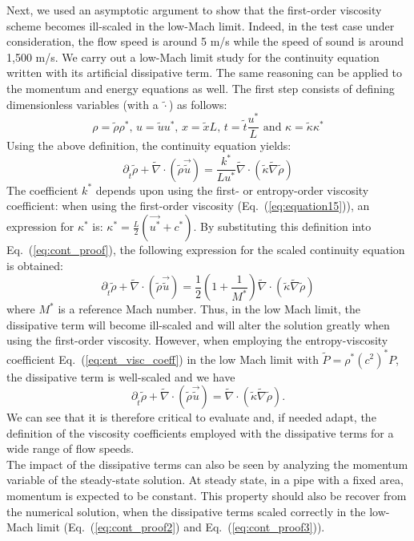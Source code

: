 \documentclass[12pt]{article}
\newcommand{\eqt}[1]{Eq.~(\ref{#1})} %
\begin{document}
Next, we used an asymptotic argument to show that the first-order viscosity scheme becomes ill-scaled in the low-Mach limit. Indeed, in the test case under consideration, the flow speed  is around 5 m/s while the speed of sound is around 1,500 m/s. We carry out a low-Mach limit study for the continuity equation written with its artificial dissipative term. The same reasoning can be applied to the momentum and energy equations as well. The first step consists of defining dimensionless variables (with a $\tilde{\cdot}$) as follows:
\begin{equation}
\rho = \tilde{\rho} \rho^* \text{, } u = \tilde{u} u^* \text{, } x = \tilde{x} L \text{, } t = \tilde{t} \frac{u^*}{L} \text{ and } \kappa = \tilde{\kappa} \kappa^* 
\end{equation}
Using the above definition, the continuity equation yields:
\begin{equation}
\label{eq:cont_proof}
\partial_{\tilde{t}} \tilde{\rho} + \tilde{\nabla} \cdot \left( \tilde{\rho} \vec{\tilde{u}} \right) =  \frac{k^*}{L u^*}  \tilde{\nabla}  \cdot  \left( \tilde{\kappa}  \tilde{\nabla} \tilde{\rho} \right)
\end{equation}
The coefficient $k^*$ depends upon using the first- or entropy-order viscosity coefficient: when using the first-order viscosity (\eqt{eq:equation15}), an expression for $\kappa^*$ is: $\kappa^* = \frac{L}{2}\left( \vec{u^*} + c^* \right)$. By substituting this definition into \eqt{eq:cont_proof}, the following expression for the scaled continuity equation is obtained:
\begin{equation}
\label{eq:cont_proof2}
\partial_{\tilde{t}} \tilde{\rho} + \tilde{\nabla} \cdot \left( \tilde{\rho} \vec{\tilde{u}} \right) = \frac{1}{2}\left( 1 + \frac{1}{M^*} \right)  \tilde{\nabla} \cdot \left(\tilde{\kappa}\tilde{\nabla} \tilde{\rho} \right)
\end{equation}
where $M^*$ is a reference Mach number. Thus, in the low Mach limit, the dissipative term will become ill-scaled and will alter the solution greatly
when using the first-order viscosity. However, when employing the entropy-viscosity coefficient \eqt{eq:ent_visc_coeff} in the low Mach limit with 
$\tilde{P} = \rho^* (c^2)^* P$, the dissipative term is well-scaled and we have
\begin{equation}
\label{eq:cont_proof3}
\partial_{\tilde{t}} \tilde{\rho} + \tilde{\nabla} \cdot \left( \tilde{\rho} \vec{\tilde{u}} \right) =  \tilde{\nabla} \cdot  \left(\tilde{\kappa}\tilde{\nabla}  \tilde{\rho} \right).
\end{equation}
We can see that it is therefore critical to evaluate and, if needed adapt, the definition of the viscosity coefficients employed with the dissipative terms for a wide range of flow speeds. \\
The impact of the dissipative terms can also be seen by analyzing the momentum variable of the steady-state solution. At steady state, in a pipe with a fixed area, momentum is expected to be constant. This property should also be recover from the numerical solution, when the dissipative terms scaled correctly in the low-Mach limit (\eqt{eq:cont_proof2} and \eqt{eq:cont_proof3}).
\end{document}
